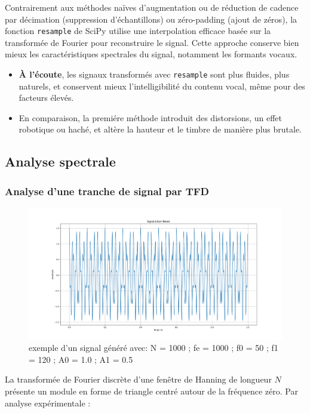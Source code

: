 Contrairement aux méthodes naïves d’augmentation ou de réduction de cadence par décimation (suppression d’échantillons) ou zéro-padding (ajout de zéros), la fonction \texttt{resample} de SciPy utilise une interpolation efficace basée sur la transformée de Fourier pour reconstruire le signal. Cette approche conserve bien mieux les caractéristiques spectrales du signal, notamment les formants vocaux.

\begin{itemize}
    \item \textbf{À l’écoute}, les signaux transformés avec \texttt{resample} sont plus fluides, plus naturels, et conservent mieux l’intelligibilité du contenu vocal, même pour des facteurs élevés.
    \item En comparaison, la premiére méthode introduit des distorsions, un effet robotique ou haché, et altère la hauteur et le timbre de manière plus brutale.
\end{itemize}

\newpage 
\subsection{Analyse spectrale}
\subsubsection{Analyse d’une tranche de signal par TFD}

\begin{figure}[h!]
    \centering
    \includegraphics[width=18cm]{screenshots/somme_2_cos.png}
    \caption{exemple d'un signal généré avec: N = 1000 ; fe = 1000 ; f0 = 50 ; f1 = 120 ; A0 = 1.0 ; A1 = 0.5}
\end{figure}

\newpage
La transformée de Fourier discrète d’une fenêtre de Hanning de longueur $N$ présente un module en forme de triangle centré autour de la fréquence zéro. Par analyse expérimentale :

